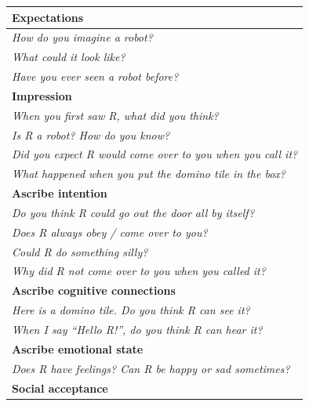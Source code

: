 \documentclass{sig-alternate}
\begin{document}
\begin{table}[h!t]
\centering
\footnotesize
\begin{tabular}{p{1\linewidth}}
    \toprule
    \textbf{Expectations} \\
    \midrule

    \emph{How do you imagine a robot?} \\
    \emph{What could it look like?} \\
    \emph{Have you ever seen a robot before?} \\

    \toprule
    \textbf{Impression} \\
    \midrule


    \emph{When you first saw R, what did you think?} \\
    \emph{Is R a robot? How do you know?} \\
    \emph{Did you expect R would come over to you when you call it?} \\
    \emph{What happened when you put the domino tile in the box?} \\

    \toprule
    \textbf{Ascribe intention} \\
    \midrule


    \emph{Do you think R could go out the door all by itself?} \\	
    \emph{Does R always obey / come over to you?} \\
    \emph{Could R do something silly?} \\
    \emph{Why did R not come over to you when you called it?} \\

    \toprule
    \textbf{Ascribe cognitive connections} \\
    \midrule


    \emph{Here is a domino tile. Do you think R can see it?} \\ 
    \emph{When I say \textit{``Hello R!''}, do you think R can hear it?} \\

    \toprule
    \textbf{Ascribe emotional state} \\
    \midrule


    \emph{Does R have feelings? Can R be happy or sad sometimes?} \\

    \toprule
    \textbf{Social acceptance} \\
    \midrule



\end{tabular}
\end{table}
\end{document}
